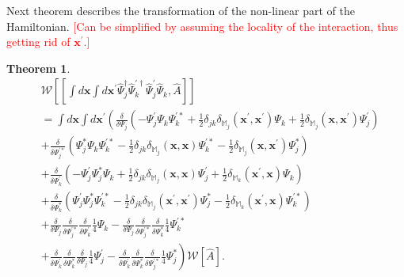 \documentclass[12pt,aip,jmp,amssymb,amsmath]{revtex4-1}
\newcommand{\todo}[1]{\textcolor{red}{[#1]}}
\newcommand{\xvec}{\boldsymbol{x}}
\newcommand{\Psiop}{\hat{\Psi}}
\newcommand{\restbasis}{\mathbb{M}}
\newtheorem{theorem}{Theorem}
\begin{document}
Next theorem describes the transformation of the non-linear part of the Hamiltonian.
\todo{Can be simplified by assuming the locality of the interaction, thus getting rid of $\xvec^\prime$.}

\begin{theorem}
\label{thm:transformations:w-commutator2}
    \begin{equation*}\begin{split}
        & \mathcal{W} \left[
            [
                \int d\xvec \int d\xvec^\prime
                \Psiop_j^\dagger \Psiop_k^{\prime\dagger} \Psiop_j^\prime \Psiop_k,
                \hat{A}
            ]
        \right] \\
        & = \int d\xvec \int d\xvec^\prime \left(
            \frac{\delta}{\delta \Psi_j} \left(
                - \Psi_j^\prime \Psi_k \Psi_k^{\prime*}
                + \frac{1}{2} \delta_{jk} \delta_{\restbasis_j}(\xvec^\prime, \xvec^\prime) \Psi_k
                + \frac{1}{2} \delta_{\restbasis_j}(\xvec, \xvec^\prime) \Psi_j^\prime
            \right) \right . \\
        &   \left. + \frac{\delta}{\delta \Psi_j^{\prime*}} \left(
                \Psi_j^* \Psi_k \Psi_k^{\prime*}
                - \frac{1}{2} \delta_{jk} \delta_{\restbasis_j}(\xvec, \xvec) \Psi_k^{\prime*}
                - \frac{1}{2} \delta_{\restbasis_j}(\xvec, \xvec^\prime) \Psi_j^*
            \right) \right. \\
        &   \left. + \frac{\delta}{\delta \Psi_k^\prime} \left(
                - \Psi_j^\prime \Psi_j^* \Psi_k
                + \frac{1}{2} \delta_{jk} \delta_{\restbasis_j}(\xvec, \xvec) \Psi_j^\prime
                + \frac{1}{2} \delta_{\restbasis_k}(\xvec^\prime, \xvec) \Psi_k
            \right) \right .\\
        &   \left. + \frac{\delta}{\delta \Psi_k^*} \left(
                \Psi_j^\prime \Psi_j^* \Psi_k^{\prime*}
                - \frac{1}{2} \delta_{jk} \delta_{\restbasis_j}(\xvec^\prime, \xvec^\prime) \Psi_j^*
                - \frac{1}{2} \delta_{\restbasis_k}(\xvec^\prime, \xvec) \Psi_k^{\prime*}
            \right) \right. \\
        &   \left.
                + \frac{\delta}{\delta \Psi_j}
                \frac{\delta}{\delta \Psi_j^{\prime*}}
                \frac{\delta}{\delta \Psi_k^\prime}
                \frac{1}{4} \Psi_k
                - \frac{\delta}{\delta \Psi_j}
                \frac{\delta}{\delta \Psi_j^{\prime*}}
                \frac{\delta}{\delta \Psi_k^*}
                \frac{1}{4} \Psi_k^{\prime*}
            \right. \\
        &   \left.
                + \frac{\delta}{\delta \Psi_k^\prime}
                \frac{\delta}{\delta \Psi_k^*}
                \frac{\delta}{\delta \Psi_j}
                \frac{1}{4} \Psi_j^\prime
                - \frac{\delta}{\delta \Psi_k^\prime}
                \frac{\delta}{\delta \Psi_k^*}
                \frac{\delta}{\delta \Psi_j^{\prime*}}
                \frac{1}{4} \Psi_j^*
        \right) \mathcal{W}[\hat{A}].
    \end{split}\end{equation*}
\end{theorem}
\end{document}
